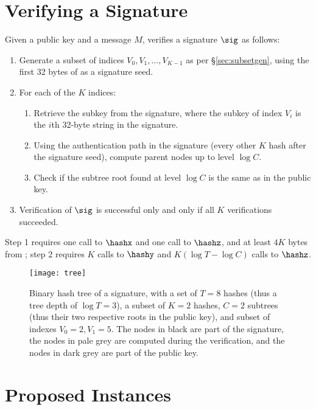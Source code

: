 \section{Verifying a Signature}

Given a public key \pk and a message $M$, \gravity verifies a signature $\sig$ as follows:

\begin{enumerate}

\item Generate a subset of indices $V_0, V_1,\dots,V_{K-1}$ as per \S\ref{sec:subsetgen}, using the first 32 bytes of \sig as a signature seed.

\item For each of the $K$ indices:
\begin{enumerate}

\item Retrieve the subkey from the signature, where the subkey of index $V_i$ is the $i$th 32-byte string in the signature.

\item Using the authentication path in the signature (every other $K$ hash after the signature seed), compute parent nodes up to level $\log C$.

\item Check if the subtree root found at level $\log C$ is the same as in the public key.

\end{enumerate}
\item Verification of $\sig$ is successful only and only if all $K$ verifications succeeded.
\end{enumerate}

Step 1 requires one call to $\hashx$ and one call to $\hashz$, and at least $4K$ bytes from \drbg; step 2 requires $K$ calls to $\hashy$ and $K (\log T- \log C)$ calls to $\hashz$.


\begin{figure}
\texttt{[image: tree]}
\caption{Binary hash tree of a signature, with a set of $T=8$ hashes (thus a tree depth of $\log T=3$), a subset of $K=2$ hashes, $C=2$ subtrees (thus their two respective roots in the public key), and subset of indexes $V_0=2, V_1=5$. The nodes in black are part of the signature, the nodes in pale grey are computed during the verification, and the nodes in dark grey are part of the public key.
}
\end{figure}

\section{Proposed Instances}

